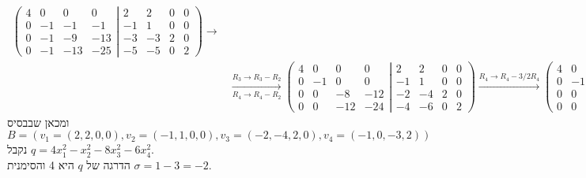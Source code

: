 \documentclass{article}
\begin{document}
\begin{align*}
    \left(
    \begin{matrix}
            4 & 0  & 0   & 0   \\
            0 & -1 & -1  & -1  \\
            0 & -1 & -9  & -13 \\
            0 & -1 & -13 & -25
        \end{matrix}
    \left|
    \begin{matrix}
            2  & 2  & 0 & 0 \\
            -1 & 1  & 0 & 0 \\
            -3 & -3 & 2 & 0 \\
            -5 & -5 & 0 & 2
        \end{matrix}
    \right.
    \right)\rightarrow                                                         \\
                & \xrightarrow[R_4\rightarrow R_4-R_2]{R_3\rightarrow R_3-R_2}
    \left(
    \begin{matrix}
            4 & 0  & 0   & 0   \\
            0 & -1 & 0   & 0   \\
            0 & 0  & -8  & -12 \\
            0 & 0  & -12 & -24
        \end{matrix}
    \left|
    \begin{matrix}
            2  & 2  & 0 & 0 \\
            -1 & 1  & 0 & 0 \\
            -2 & -4 & 2 & 0 \\
            -4 & -6 & 0 & 2
        \end{matrix}
    \right.
    \right)
    \xrightarrow[]{R_4\rightarrow R_4-3/2R_4}
    \left(
    \begin{matrix}
            4 & 0  & 0  & 0  \\
            0 & -1 & 0  & 0  \\
            0 & 0  & -8 & 0  \\
            0 & 0  & 0  & -6
        \end{matrix}
    \left|
    \begin{matrix}
            2  & 2  & 0  & 0 \\
            -1 & 1  & 0  & 0 \\
            -2 & -4 & 2  & 0 \\
            -1 & 0  & -3 & 2
        \end{matrix}
    \right.
    \right)
\end{align*}
ומכאן שבבסיס $B=(v_1=(2, 2, 0, 0), v_2=(-1, 1, 0, 0), v_3=(-2, -4, 2, 0), v_4=(-1, 0, -3, 2))$ נקבל $q=4x_1^2-x_2^2-8x_3^2-6x_4^2$. \\
הדרגה של $q$ היא 4 והסימנית $\sigma=1-3=-2$.
\end{document}

